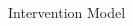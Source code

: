 \documentclass[serif,mathserif,final]{beamer}
\begin{document}
\begin{frame}{}
\begin{columns}[t]
    \begin{column}{0.35\linewidth}

      \begin{block}{Intervention Model} \small
        

\end{block}
\end{column}
\end{columns}
\end{frame}
\end{document}
